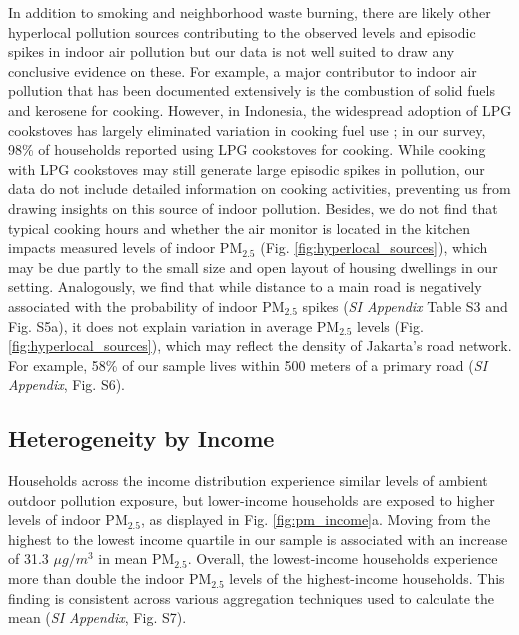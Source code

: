 \documentclass[9pt,twocolumn,twoside]{pnas-new}
\begin{document}
In addition to smoking and neighborhood waste burning, there are likely other hyperlocal pollution sources contributing to the observed levels and episodic spikes in indoor air pollution but our data is not well suited to draw any conclusive evidence on these. For example, a major contributor to indoor air pollution that has been documented extensively is the combustion of solid fuels and kerosene for cooking. However, in Indonesia, the widespread adoption of LPG cookstoves has largely eliminated variation in cooking fuel use \citep{astuti_successful_2019}; in our survey, 98\% of households reported using LPG cookstoves for cooking. While cooking with LPG cookstoves may still generate large episodic spikes in pollution, our data do not include detailed information on cooking activities, preventing us from drawing insights on this source of indoor pollution. Besides, we do not find that typical cooking hours and whether the air monitor is located in the kitchen impacts measured levels of indoor PM$_{2.5}$ (Fig. \ref{fig:hyperlocal_sources}), which may be due partly to the small size and open layout of housing dwellings in our setting. 
Analogously, we find that while distance to a main road is negatively associated with the probability of indoor PM$_{2.5}$ spikes (\textit{SI Appendix} Table S3 and Fig. S5a), it does not explain variation in average PM$_{2.5}$ levels (Fig. \ref{fig:hyperlocal_sources}), which may reflect the density of Jakarta’s road network. For example, 58\% of our sample lives within 500 meters of a primary road (\textit{SI Appendix}, Fig. S6).


\subsection{Heterogeneity by Income}

Households across the income distribution experience similar levels of ambient outdoor pollution exposure, but lower-income households are exposed to higher levels of indoor PM$_{2.5}$, as displayed in Fig. \ref{fig:pm_income}a. Moving from the highest to the lowest income quartile in our sample is associated with an increase of 31.3 $\mu g/m^3$ in mean PM$_{2.5}$. Overall, the lowest-income households experience more than double the indoor PM$_{2.5}$ levels of the highest-income households. This finding is consistent across various aggregation techniques used to calculate the mean (\textit{SI Appendix}, Fig. S7).
\end{document}
